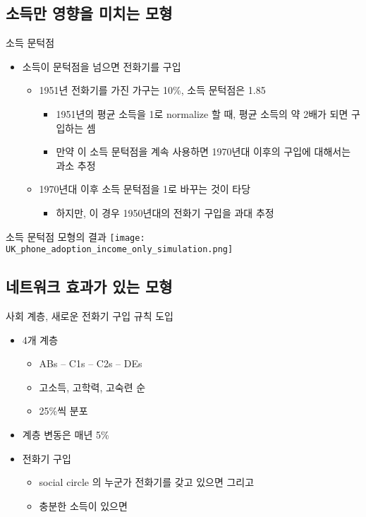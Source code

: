 \documentclass[hyperref={unicode}]{beamer}
\begin{document}
\subsection{소득만 영향을 미치는 모형}
\begin{frame}{소득 문턱점}
\begin{itemize}
\item 소득이 문턱점을 넘으면 전화기를 구입
	\begin{itemize}
	\item 1951년 전화기를 가진 가구는 10\%, 소득 문턱점은 1.85
		\begin{itemize}
		\item 1951년의 평균 소득을 1로 normalize 할 때, 평균 소득의 약 2배가 되면 구입하는 셈
		\item 만약 이 소득 문턱점을 계속 사용하면 1970년대 이후의 구입에 대해서는 과소 추정
		\end{itemize}
	\item 1970년대 이후 소득 문턱점을 1로 바꾸는 것이 타당
		\begin{itemize}
		\item 하지만, 이 경우 1950년대의 전화기 구입을 과대 추정
		\end{itemize}
	\end{itemize}
\end{itemize}	
\end{frame}

\begin{frame}{소득 문턱점 모형의 결과}
\texttt{[image: UK\_phone\_adoption\_income\_only\_simulation.png]}
\end{frame}

\subsection{네트워크 효과가 있는 모형}
\begin{frame}{사회 계층, 새로운 전화기 구입 규칙 도입}
\begin{itemize}
\item 4개 계층
	\begin{itemize}
	\item ABs -- C1s -- C2s -- DEs
	\item 고소득, 고학력, 고숙련 순
	\item 25\%씩 분포
	\end{itemize}
\item 계층 변동은 매년 5\%
\item 전화기 구입
	\begin{itemize}
	\item social circle 의 누군가 전화기를 갖고 있으면 그리고
	\item 충분한 소득이 있으면
	\end{itemize}
\end{itemize}	
\end{frame}
\end{document}
